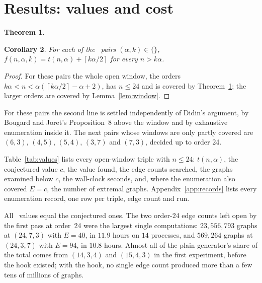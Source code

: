 \documentclass[11pt]{article}
\newtheorem{theorem}{Theorem}
\newtheorem{corollary}[theorem]{Corollary}
\theoremstyle{definition}
\theoremstyle{remark}
\newcommand{\ceil}[1]{\left\lceil #1\right\rceil}
\begin{document}
\begin{table}[t]
\centering\footnotesize\setlength{\tabcolsep}{2.5pt}
\caption{Validation of the search: each check, the experiment that holds its record, its scope, the number of
items checked and the outcome. Independent implementation: NetworkX 3.4.1. Every row passed.}
\label{tab:validation}

\end{table}

\section{Results: values and cost}\label{sec:values}

\begin{theorem}\label{thm:values}
\end{theorem}

\begin{corollary}\label{cor:fullpairs}
For each of the \nfullpairs\ pairs $(\alpha,k)\in\{$\fullpairs$\}$, $f(n,\alpha,k)=t(n,\alpha)+\ceil{k\alpha/2}$ for
every $n>k\alpha$.
\end{corollary}

\begin{proof}
For these pairs the whole open window, the orders $k\alpha<n<\alpha(\ceil{k\alpha/2}-\alpha+2)$, has $n\le24$ and is
covered by Theorem~\ref{thm:values}; the larger orders are covered by Lemma~\ref{lem:window}.
\end{proof}

For these pairs the second line is settled independently of Didin's argument, by Bougard and Joret's Proposition~8
above the window and by exhaustive enumeration inside it. The next pairs whose windows are only partly covered are
$(6,3)$, $(4,5)$, $(5,4)$, $(3,7)$ and $(7,3)$, decided up to order 24.

Table~\ref{tab:values} lists every open-window triple with $n\le24$: $t(n,\alpha)$, the conjectured value $c$, the
value found, the edge counts searched, the graphs examined below $c$, the wall-clock seconds, and, where the
enumeration also covered $E=c$, the number of extremal graphs. Appendix~\ref{app:records} lists every enumeration
record, one row per triple, edge count and run.

All \ntriples\ values equal the conjectured ones. The two order-24 edge counts left open by the first pass at
order~24 were the largest single computations: $23{,}556{,}793$ graphs at $(24,7,3)$ with $E=40$, in $11.9$ hours on
$14$ processes, and $569{,}264$ graphs at $(24,3,7)$ with $E=94$, in $10.8$ hours. Almost all of the plain generator's
share of the total comes from $(14,3,4)$ and $(15,4,3)$ in the first experiment, before the hook existed; with the
hook, no single edge count produced more than a few tens of millions of graphs.
\end{document}

